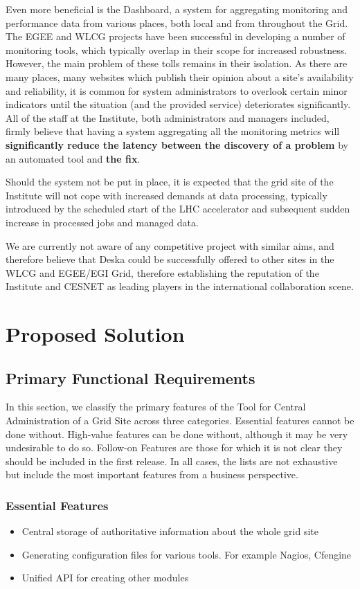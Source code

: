 \documentclass[12pt]{article}
\begin{document}
Even more beneficial is the Dashboard, a system for aggregating monitoring and performance data from various places, both local
and from throughout the Grid.  The EGEE and WLCG projects have been successful in developing a number of monitoring tools, which
typically overlap in their scope for increased robustness.  However, the main problem of these tolls remains in their isolation.
As there are many places, many websites which publish their opinion about a site's availability and reliability, it is common for
system administrators to overlook certain minor indicators until the situation (and the provided service) deteriorates
significantly.  All of the staff at the Institute, both administrators and managers included, firmly believe that having a system
aggregating all the monitoring metrics will {\bf significantly reduce the latency between the discovery of a problem} by an
automated tool and {\bf the fix}.

Should the system not be put in place, it is expected that the grid site of the Institute will not cope with increased demands at
data processing, typically introduced by the scheduled start of the LHC accelerator and subsequent sudden increase in processed
jobs and managed data.

We are currently not aware of any competitive project with similar aims, and therefore believe that Deska could be successfully
offered to other sites in the WLCG and EGEE/EGI Grid, therefore establishing the reputation of the Institute and CESNET as leading
players in the international collaboration scene.

\section{Proposed Solution}

\subsection{Primary Functional Requirements}
In this section, we classify the primary features of the Tool for Central Administration of a Grid Site across three categories. 
Essential features cannot be done without. High-value features can be done without, although it may be very undesirable to do so. 
Follow-on Features are those for which it is not clear they should be included in the first release. In all cases, the lists are not 
exhaustive but include the most important features from a business perspective.

\subsubsection{Essential Features}
\begin{itemize}
	\item Central storage of authoritative information about the whole grid site
	\item Generating configuration files for various tools. For example Nagios, Cfengine
	\item Unified API for creating other modules
\end{itemize}
\end{document}
